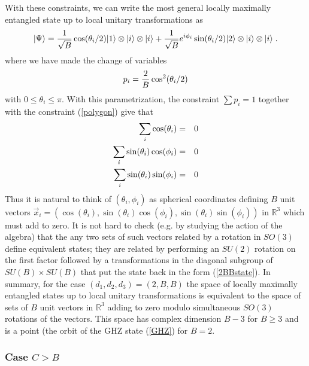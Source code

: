 \documentclass[12pt]{article}
\theoremstyle{definition}
\newcommand{\be}{\begin{equation}}
\newcommand{\ee}{\end{equation}}
\newcommand{\bea}{\begin{eqnarray}}
\newcommand{\eea}{\end{eqnarray}}
\begin{document}
With these constraints, we can write the most general locally maximally entangled state up to local unitary transformations as
\be
\label{2BBstate}
|\Psi \rangle = {1 \over \sqrt{B}} \cos(\theta_i /2) |1 \rangle \otimes |i \rangle \otimes |i \rangle + {1 \over \sqrt{B}} e^{i \phi_i} \sin(\theta_i /2) |2 \rangle \otimes |i \rangle \otimes |i \rangle  \; .
\ee
where we have made the change of variables
\be
p_i = {2 \over B} \cos^2(\theta_i/2)
\ee
with $0 \le \theta_i \le \pi$.
With this parametrization, the constraint $\sum p_i = 1$ together with the constraint (\ref{polygon}) give that
\bea
\sum_i \cos(\theta_i) &=& 0 \cr
\sum_i \sin(\theta_i) \cos(\phi_i) &=& 0 \cr
\sum_i \sin(\theta_i) \sin(\phi_i) &=& 0
\eea
Thus it is natural to think of $(\theta_i, \phi_i)$ as spherical coordinates defining $B$ unit vectors $\vec{x}_i = (\cos(\theta_i),\sin(\theta_i) \cos(\phi_i),\sin(\theta_i) \sin(\phi_i))$ in  $\mathbb{R}^3$ which must add to zero. It is not hard to check (e.g. by studying the action of the algebra) that the any two sets of such vectors related by a rotation in $SO(3)$ define equivalent states; they are related by performing an $SU(2)$ rotation on the first factor followed by a transformations in the diagonal subgroup of $SU(B) \times SU(B)$ that put the state back in the form (\ref{2BBstate}). In summary, for the case $(d_1,d_2,d_3) = (2,B,B)$ the space of locally maximally entangled states up to local unitary transformations is equivalent to the space of sets of $B$ unit vectors in $\mathbb{R}^3$ adding to zero modulo simultaneous $SO(3)$ rotations of the vectors. This space has complex dimension $B-3$ for $B \ge 3$ and is a point (the orbit of the GHZ state (\ref{GHZ}) for $B=2$.

\subsubsection*{Case $C>B$}
\end{document}
